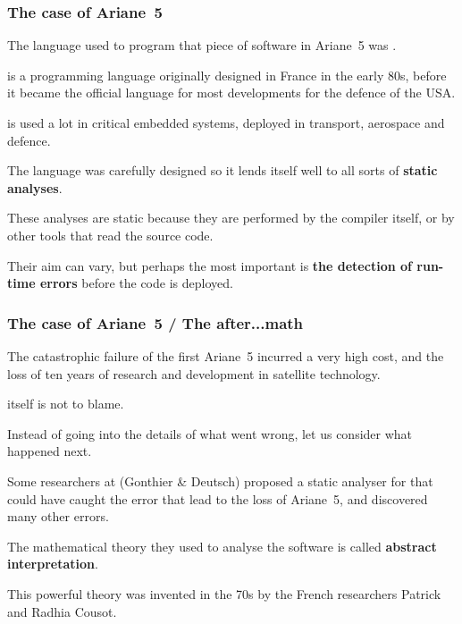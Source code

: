\documentclass[compress,dvipdfmx]{beamer}
\begin{document}
\begin{frame}
  \frametitle{The case of Ariane~5}

  The language used to program that piece of software in Ariane~5 was
  \Ada.

  \bigskip

  \Ada is a programming language originally designed in France in the
  early 80s, before it became the official language for most
  developments for the defence of the USA.

  \bigskip

  \Ada is used a lot in critical embedded systems, deployed in
  transport, aerospace and defence.

  \bigskip

  The language was carefully designed so it lends itself well to all
  sorts of \textbf{static analyses}.

  \bigskip

  These analyses are static because they are performed by the \Ada
  compiler itself, or by other tools that read the source code.

  \bigskip

  Their aim can vary, but perhaps the most important is \textbf{the
    detection of run\hyp{}time errors} before the code is deployed.

\end{frame}


\begin{frame}
  \frametitle{The case of Ariane~5 / The after...math}

  The catastrophic failure of the first Ariane~5 incurred a very high
  cost, and the loss of ten years of research and development in
  satellite technology.

  \bigskip

  \Ada itself is not to blame.

  \bigskip

  Instead of going into the details of what went wrong, let us
  consider what happened next.

  \bigskip

  Some researchers at \Inria (Gonthier \& Deutsch) proposed a static
  analyser for \Ada that could have caught the error that lead to the
  loss of Ariane~5, and discovered many other errors.

  \bigskip

  The mathematical theory they used to analyse the software is called
  \textbf{abstract interpretation}.

  \bigskip

  This powerful theory was invented in the 70s by the French
  researchers Patrick and Radhia Cousot.

\end{frame}
\end{document}
